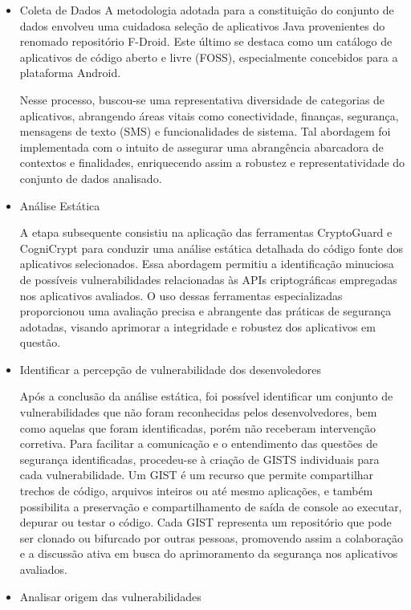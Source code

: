 \begin{itemize}
\item{Coleta de Dados}
A metodologia adotada para a constituição do conjunto de dados envolveu uma cuidadosa seleção de aplicativos Java provenientes do renomado repositório F-Droid. Este último se destaca como um catálogo de aplicativos de código aberto e livre (FOSS), especialmente concebidos para a plataforma Android.

Nesse processo, buscou-se uma representativa diversidade de categorias de aplicativos, abrangendo áreas vitais como conectividade, finanças, segurança, mensagens de texto (SMS) e funcionalidades de sistema. Tal abordagem foi implementada com o intuito de assegurar uma abrangência abarcadora de contextos e finalidades, enriquecendo assim a robustez e representatividade do conjunto de dados analisado.

\item{Análise Estática}

A etapa subsequente consistiu na aplicação das ferramentas CryptoGuard e CogniCrypt para conduzir uma análise estática detalhada do código fonte dos aplicativos selecionados. Essa abordagem permitiu a identificação minuciosa de possíveis vulnerabilidades relacionadas às APIs criptográficas empregadas nos aplicativos avaliados. O uso dessas ferramentas especializadas proporcionou uma avaliação precisa e abrangente das práticas de segurança adotadas, visando aprimorar a integridade e robustez dos aplicativos em questão.

\item{Identificar a percepção de vulnerabilidade dos desenvoledores}

Após a conclusão da análise estática, foi possível identificar um conjunto de vulnerabilidades que não foram reconhecidas pelos desenvolvedores, bem como aquelas que foram identificadas, porém não receberam intervenção corretiva. Para facilitar a comunicação e o entendimento das questões de segurança identificadas, procedeu-se à criação de GISTS individuais para cada vulnerabilidade. Um GIST é um recurso que permite compartilhar trechos de código, arquivos inteiros ou até mesmo aplicações, e também possibilita a preservação e compartilhamento de saída de console ao executar, depurar ou testar o código. Cada GIST representa um repositório que pode ser clonado ou bifurcado por outras pessoas, promovendo assim a colaboração e a discussão ativa em busca do aprimoramento da segurança nos aplicativos avaliados.

\item{Analisar origem das vulnerabilidades}


\end{itemize}
